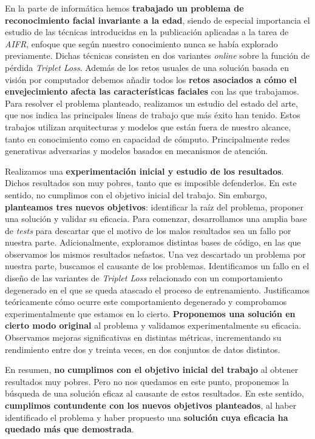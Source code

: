 En la parte de informática hemos \textbf{trabajado un problema de reconocimiento facial invariante a la edad}, siendo de especial importancia el estudio de las técnicas introducidas en la publicación \cite{informatica:principal} aplicadas a la tarea de \textit{AIFR}, enfoque que según nuestro conocimiento nunca se había explorado previamente. Dichas técnicas consisten en dos variantes \textit{online} sobre la función de pérdida \textit{Triplet Loss}.  Además de los retos usuales de una solución basada en visión por computador debemos añadir todos los \textbf{retos asociados a cómo el envejecimiento afecta las características faciales} con las que trabajamos. Para resolver el problema planteado, realizamos un estudio del estado del arte, que nos indica las principales líneas de trabajo que más éxito han tenido. Estos trabajos utilizan arquitecturas y modelos que están fuera de nuestro alcance, tanto en conocimiento como en capacidad de cómputo. Principalmente redes generativas adversarias y modelos basados en mecanismos de atención.

Realizamos una \textbf{experimentación inicial y estudio de los resultados}. Dichos resultados son muy pobres, tanto que es imposible defenderlos. En este sentido, no cumplimos con el objetivo inicial del trabajo. Sin embargo, \textbf{planteamos tres nuevos objetivos}: identificar la raíz del problema, proponer una solución y validar su eficacia. Para comenzar, desarrollamos una amplia base de \textit{tests} para descartar que el motivo de los malos resultados sea un fallo por nuestra parte. Adicionalmente, exploramos distintas bases de código, en las que observamos los mismos resultados nefastos. Una vez descartado un problema por nuestra parte, buscamos el causante de los problemas. Identificamos un fallo en el diseño de las variantes de \textit{Triplet Loss} relacionado con un comportamiento degenerado en el que se queda atascado el proceso de entrenamiento. Justificamos teóricamente cómo ocurre este comportamiento degenerado y comprobamos experimentalmente que estamos en lo cierto. \textbf{Proponemos una solución en cierto modo original} al problema y validamos experimentalmente su eficacia. Observamos mejoras significativas en distintas métricas, incrementando su rendimiento entre dos y treinta veces, en dos conjuntos de datos distintos.

En resumen, \textbf{no cumplimos con el objetivo inicial del trabajo} al obtener resultados muy pobres. Pero no nos quedamos en este punto, proponemos la búsqueda de una solución eficaz al causante de estos resultados. En este sentido, \textbf{cumplimos contundente con los nuevos objetivos planteados}, al haber identificado el problema y haber propuesto una \textbf{solución cuya eficacia ha quedado más que demostrada}.

\endinput
